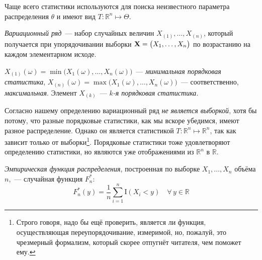 Чаще всего статистики используются для поиска неизвестного параметра распределения $\theta$ и имеют вид $T\colon \mathbb{R}^n \mapsto \Theta$.


\begin{defn}
    \textit{Вариационный ряд}~--- набор случайных величин $X_{(1)}, \ldots, X_{(n)}$, который получается при упорядочивании выборки $\mathbf{X} = \bigl( X_1, \ldots, X_n \bigr)$ по возрастанию на каждом элементарном исходе. 

    $X_{(1)}(\omega)=\min \bigl(X_{1}(\omega), \ldots, X_{n}(\omega)\bigr)$~--- \textit{минимальная порядковая статистика}, 
    $X_{(n)}(\omega)=\max \bigl(X_{1}(\omega), \ldots, X_{n}(\omega)\bigr)$~--- соответственно, \textit{максимальная}.
    Элемент $X_{(k)}$~--- \textit{$k$-я порядковая статистика}. 
\end{defn}

\begin{rmrk}
    Согласно нашему определению вариационный ряд \textit{не является выборкой}, хотя бы потому, что разные порядковые статистики, как мы вскоре убедимся, имеют разное распределение.
    Однако он является статистикой $T\colon \mathbb{R}^n \mapsto \mathbb{R}^n$, так как зависит только от выборки\footnote{Строго говоря, надо бы ещё проверить, является ли функция, осуществляющая переупорядочивание, измеримой, но, пожалуй, это чрезмерный формализм, который скорее отпугнёт читателя, чем поможет ему.}.
    Порядковые статистики тоже удовлетворяют определению статистики, но являются уже отображениями из $\mathbb{R}^n$ в $\mathbb{R}$.
\end{rmrk}

\begin{defn}
    \textit{Эмпирическая функция распределения}, построенная по выборке $X_{1}, \ldots, X_{n}$ объёма $n$,~--- случайная функция $F_{n}^{*}$:
    \begin{equation*}
        F_{n}^{*}(y) =\frac{1}{n} \sum\limits_{i=1}^{n} \mathrm{I}(X_{i}<y) \quad \forall \, y \in \mathbb{R}
    \end{equation*}
\end{defn}

